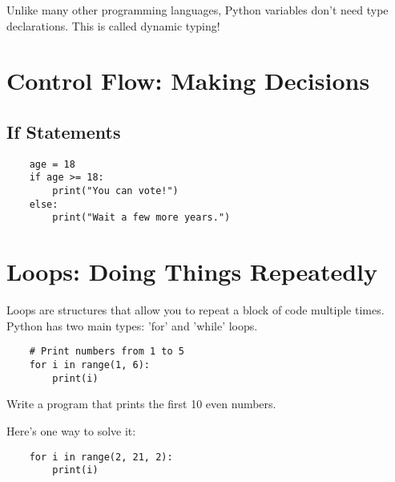 \begin{remark}
    Unlike many other programming languages, Python variables don't need type declarations. This is called dynamic typing!
\end{remark}

\section{Control Flow: Making Decisions}
\label{sec:control-flow}

\subsection{If Statements}
\label{subsec:if-statements}

\begin{example}
    \begin{verbatim}
    age = 18
    if age >= 18:
        print("You can vote!")
    else:
        print("Wait a few more years.")
    \end{verbatim}
\end{example}

\section{Loops: Doing Things Repeatedly}
\label{sec:loops}

\begin{definition}[Loops]
    Loops are structures that allow you to repeat a block of code multiple times. Python has two main types: 'for' and 'while' loops.
\end{definition}

\begin{example}
    \begin{verbatim}
    # Print numbers from 1 to 5
    for i in range(1, 6):
        print(i)
    \end{verbatim}
\end{example}

\begin{exercise}
    Write a program that prints the first 10 even numbers.
\end{exercise}

\begin{solution}
    Here's one way to solve it:
    \begin{verbatim}
    for i in range(2, 21, 2):
        print(i)
    \end{verbatim}
\end{solution}

